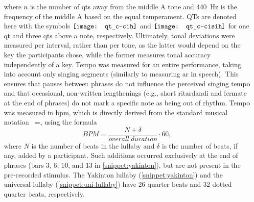 \noindent
%
where $n$ is the number of \acp{qt} away from the middle A tone \citep[cf.][]{DeKlerk1979equal} and \SI{440}{\hertz} is the frequency of the middle A based on the equal temperament.
QTs are denoted here with the symbols \hspace{-0.26cm}
$\vcenter{\hbox{\texttt{[image: qt\_c-cih]}}}$ and 
$\vcenter{\hbox{\texttt{[image: qt\_c-cisih]}}}$ for one \ac{qt} and three \acp{qt} above a note, respectively.
Ultimately, tonal deviations were measured per interval, rather than per tone, as the latter would depend on the key the participants chose, while the former measures tonal accuracy independently of a key.
Tempo was measured for an entire performance, taking into account only singing segments (similarly to measuring \ac{ar} in speech).
This ensures that pauses between phrases do not influence the perceived singing tempo and that occasional, non-written lengthenings (e.g., short ritardandi and fermate at the end of phrases) do not mark a specific note as being out of rhythm.
Tempo was measured in \acf{bpm}, which is directly derived from the standard musical notation \musQuarter~=, using the formula
%
\begin{equation}
	\label{eq:bpm}
	BPM = \frac{N + \delta}{overall\ duration} \cdot 60,
\end{equation}
\noindent
%
where $N$ is the number of beats in the lullaby and $\delta$ is the number of beats, if any, added by a participant.
Such additions occurred exclusively at the end of phrases (bars 3, 6, 10, and 13 in \cref{snippet:yakinton}), but are not present in the pre-recorded stimulus.
The Yakinton lullaby (\cref{snippet:yakinton}) and the universal lullaby (\cref{snippet:uni-lullaby}) have 26 quarter beats and 32 dotted quarter beats, respectively.

